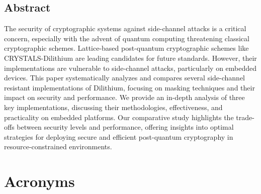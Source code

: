 \documentclass[a4paper,12pt,oneside,openany,headsepline,bibliography=totocnumbered]{scrbook}
\begin{document}


\section*{Abstract}
\thispagestyle{abstract}

The security of cryptographic systems against side-channel attacks is a critical concern, especially with the advent of quantum computing threatening classical cryptographic schemes. Lattice-based post-quantum cryptographic schemes like CRYSTALS-Dilithium are leading candidates for future standards. However, their implementations are vulnerable to side-channel attacks, particularly on embedded devices. This paper systematically analyzes and compares several side-channel resistant implementations of Dilithium, focusing on masking techniques and their impact on security and performance. We provide an in-depth analysis of three key implementations, discussing their methodologies, effectiveness, and practicality on embedded platforms. Our comparative study highlights the trade-offs between security levels and performance, offering insights into optimal strategies for deploying secure and efficient post-quantum cryptography in resource-constrained environments.

\tableofcontents
\thispagestyle{contents}

\chapter*{Acronyms}
\thispagestyle{acronyms}
\begin{acronym}[PQC]
\end{acronym}






\newpage
\listoffigures
\thispagestyle{listsoffigures}

\listoftables
\thispagestyle{listoftables}

\newpage


\thispagestyle{bibliography}
\end{document}

